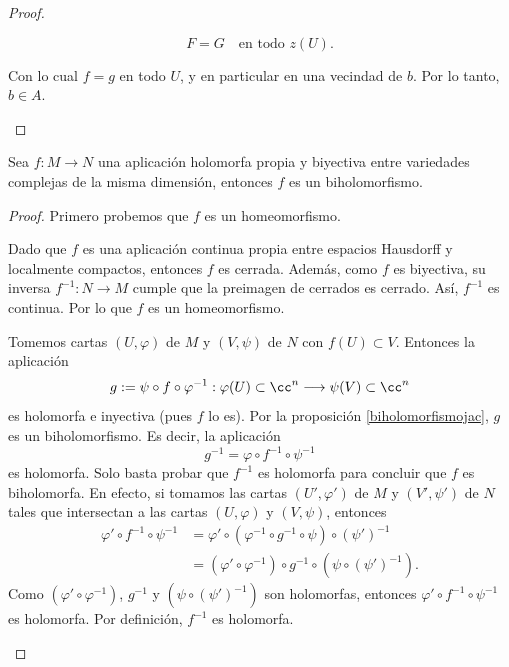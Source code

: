 \begin{proof}
\begin{itemize}
			$$
			F = G \quad \text{en todo } z(U).
			$$
			
			Con lo cual $f=g$ en todo $U$, y en particular en una vecindad de $b$. Por lo tanto, $b\in A$.
		\end{itemize}
	\end{proof}


	\begin{corollary}
		Sea $f:M\to N$ una aplicación holomorfa propia y biyectiva entre variedades complejas de la misma dimensión, entonces $f$ es un biholomorfismo.
	\end{corollary}
	\begin{proof}
		Primero probemos que $f$ es un homeomorfismo.
		
		Dado que $f$ es una aplicación continua propia entre espacios Hausdorff y localmente compactos, entonces $f$ es cerrada. Además, como $f$ es biyectiva, su inversa $f^{-1}:N\to M$ cumple que la preimagen de cerrados es cerrado. Así, $f^{-1}$ es continua. Por lo que $f$ es un homeomorfismo. 
		
		Tomemos cartas $(U,\varphi)$ de $M$ y $(V,\psi)$ de $N$ con $f(U)\subset V$. Entonces la aplicación
		\begin{equation*}
			g:=\psi\circ f\circ \varphi^{-1}:\varphi(U)\subset\cc^n\longrightarrow \psi(V)\subset\cc^n
		\end{equation*}
		es holomorfa e inyectiva (pues $f$ lo es). Por la proposición \ref{biholomorfismojac}, $g$ es un biholomorfismo. Es decir, la aplicación
		\begin{equation*}
			g^{-1}=\varphi\circ f^{-1}\circ \psi^{-1}
		\end{equation*}
		es holomorfa. Solo basta probar que $f^{-1}$ es holomorfa para concluir que $f$ es biholomorfa. En efecto, si tomamos las cartas $(U',\varphi')$ de $M$ y $(V',\psi')$ de $N$ tales que intersectan a las cartas $(U,\varphi)$ y $(V,\psi)$, entonces
		\begin{align*}
			\varphi'\circ f^{-1}\circ \psi^{-1}&=\varphi'\circ (\varphi^{-1}\circ g^{-1}\circ \psi)\circ (\psi')^{-1}\\
			&=(\varphi'\circ \varphi^{-1})\circ g^{-1}\circ (\psi\circ (\psi')^{-1}).
		\end{align*}
		Como $(\varphi'\circ \varphi^{-1})$, $g^{-1}$ y $(\psi\circ (\psi')^{-1})$ son holomorfas, entonces $\varphi'\circ f^{-1}\circ \psi^{-1}$ es holomorfa. Por definición, $f^{-1}$ es holomorfa.
		\begin{center}
		\end{center}
	\end{proof}
	
